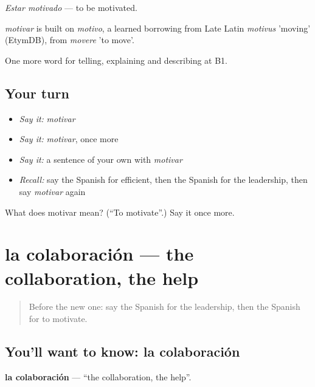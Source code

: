 \emph{Estar motivado} — to be motivated.

\begin{cousinweb}
\emph{motivar} is built on \emph{motivo}, a learned borrowing from Late Latin \emph{motivus} 'moving' (EtymDB), from \emph{movere} 'to move'.
\end{cousinweb}

\begin{grammarlens}[title={What you've built}]
One more word for telling, explaining and describing at B1.
\end{grammarlens}

\subsection*{Your turn}
\begin{itemize}
\raggedright
  \item \emph{Say it:} \emph{motivar}
  \item \emph{Say it:} \emph{motivar}, once more
  \item \emph{Say it:} a sentence of your own with \emph{motivar}
  \item \emph{Recall:} say the Spanish for efficient, then the Spanish for the leadership, then say \emph{motivar} again
\end{itemize}

\begin{tcolorbox}[breakable,colback=teal!4,colframe=teal!35!black,title={Before you move on}]
What does motivar mean? (\textquotedblleft{}To motivate\textquotedblright{}.) Say it once more.
\end{tcolorbox}
\section[la colaboración]{la colaboración — the collaboration, the help}

\label{lesson:ES-C594-colaboracion}



\begin{quote}
Before the new one: say the Spanish for the leadership, then the Spanish for to motivate.
\end{quote}

\subsection*{You'll want to know: la colaboración}
\textbf{la colaboración} — \textquotedblleft{}the collaboration, the help\textquotedblright{}.


